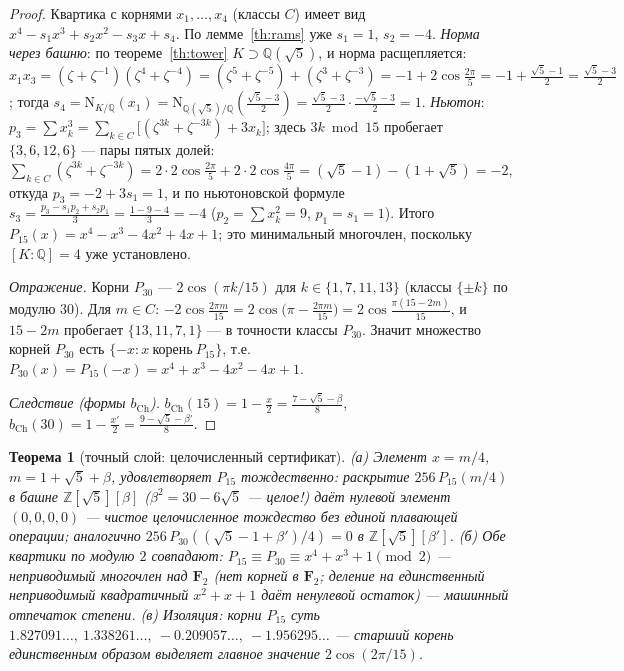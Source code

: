 \documentclass[11pt,a4paper]{article}
\theoremstyle{plain}
\newtheorem{theorem}{Теорема}
\theoremstyle{definition}
\theoremstyle{remark}
\newcommand{\ZZ}{\mathbb{Z}}
\newcommand{\QQ}{\mathbb{Q}}
\begin{document}
\begin{proof}
Квартика с корнями $x_1,\dots,x_4$ (классы $C$) имеет вид
$x^4-s_1x^3+s_2x^2-s_3x+s_4$. По лемме~\ref{th:rams} уже
$s_1=1$, $s_2=-4$. \emph{Норма через башню}: по теореме~\ref{th:tower}
$K\supset\QQ(\sqrt5)$, и норма расщепляется:
$x_1x_3=(\zeta+\zeta^{-1})(\zeta^4+\zeta^{-4})
=(\zeta^5+\zeta^{-5})+(\zeta^3+\zeta^{-3})
=-1+2\cos\frac{2\pi}{5}=-1+\frac{\sqrt5-1}{2}=\frac{\sqrt5-3}{2}$;
тогда
$s_4=\mathrm{N}_{K/\QQ}(x_1)
=\mathrm{N}_{\QQ(\sqrt5)/\QQ}\!\left(\frac{\sqrt5-3}{2}\right)
=\frac{\sqrt5-3}{2}\cdot\frac{-\sqrt5-3}{2}=1$.
\emph{Ньютон}: $p_3=\sum x_k^3=\sum_{k\in C}\!\big[(\zeta^{3k}+\zeta^{-3k})+3x_k\big]$;
здесь $3k\bmod15$ пробегает $\{3,6,12,6\}$ --- пары пятых долей:
$\sum_{k\in C}(\zeta^{3k}+\zeta^{-3k})
=2\cdot2\cos\frac{2\pi}{5}+2\cdot2\cos\frac{4\pi}{5}
=(\sqrt5-1)-(1+\sqrt5)=-2$,
откуда $p_3=-2+3s_1=1$, и по ньютоновской формуле
$s_3=\frac{p_3-s_1p_2+s_2p_1}{3}=\frac{1-9-4}{3}=-4$
($p_2=\sum x_k^2=9$, $p_1=s_1=1$). Итого
$P_{15}(x)=x^4-x^3-4x^2+4x+1$; это минимальный многочлен,
поскольку $[K:\QQ]=4$ уже установлено.

\emph{Отражение.} Корни $P_{30}$ --- $2\cos(\pi k/15)$ для
$k\in\{1,7,11,13\}$ (классы $\{\pm k\}$ по модулю $30$). Для
$m\in C$: $-2\cos\frac{2\pi m}{15}=2\cos\!\big(\pi-\frac{2\pi m}{15}\big)
=2\cos\frac{\pi(15-2m)}{15}$, и $15-2m$ пробегает
$\{13,11,7,1\}$ --- в точности классы $P_{30}$. Значит множество
корней $P_{30}$ есть $\{-x\colon x\ \text{корень}\ P_{15}\}$, т.е.
$P_{30}(x)=P_{15}(-x)=x^4+x^3-4x^2-4x+1$.

\emph{Следствие (формы $b_{\mathrm{Ch}}$).}
$b_{\mathrm{Ch}}(15)=1-\frac{x}{2}=\frac{7-\sqrt5-\beta}{8}$,
$b_{\mathrm{Ch}}(30)=1-\frac{x'}{2}=\frac{9-\sqrt5-\beta'}{8}$.
\end{proof}

\begin{theorem}[точный слой: целочисленный сертификат]\label{th:exact}
\emph{(а)} Элемент $x=m/4$, $m=1+\sqrt5+\beta$, удовлетворяет
$P_{15}$ тождественно: раскрытие $256\,P_{15}(m/4)$ в башне
$\ZZ[\sqrt5][\beta]$ ($\beta^2=30-6\sqrt5$ --- целое!) даёт
нулевой элемент $(0,0,0,0)$ --- \emph{чистое целочисленное
тождество} без единой плавающей операции; аналогично
$256\,P_{30}((\sqrt5-1+\beta')/4)=0$ в
$\ZZ[\sqrt5][\beta']$. \emph{(б)} Обе квартики по модулю $2$
совпадают: $P_{15}\equiv P_{30}\equiv x^4+x^3+1\pmod2$ ---
неприводимый многочлен над $\mathbf{F}_2$ (нет корней в
$\mathbf{F}_2$; деление на единственный неприводимый квадратичный
$x^2+x+1$ даёт ненулевой остаток) --- машинный отпечаток степени.
\emph{(в)} Изоляция: корни $P_{15}$ суть
$1.827091\ldots,\ 1.338261\ldots,\ -0.209057\ldots,\ -1.956295\ldots$
--- старший корень единственным образом выделяет главное
значение $2\cos(2\pi/15)$.
\end{theorem}
\end{document}
